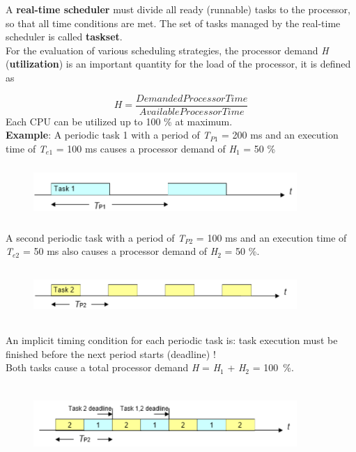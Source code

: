 A \textbf{real-time scheduler} must divide all ready (runnable) tasks to the processor, so that all time conditions are met. The set of tasks managed by the real-time scheduler is called \textbf{taskset}.\\

For the evaluation of various scheduling strategies, the processor demand \textit{H} (\textbf{utilization}) is an important quantity for the load of the processor, it is defined as

\begin{equation}
	H = \frac{Demanded Processor Time}{Available Processor Time}
\label{EQ 3}
\end{equation}
\newline
Each CPU can be utilized up to 100 \% at maximum.\\

\textbf{Example}: A periodic task 1 with a period of \textit{T}${}_{P1}$ = 200 ms and an execution time of \textit{T}${}_{e1}$ = 100 ms causes a processor demand of \textit{H}${}_{1}$ = 50 \%

	\begin{figure}[h]
    \centering
    \includegraphics[width=10cm, height=2cm]{Images/image83.png}
    \label{fig:Fig 29}
    \end{figure}
\nsl{\newpage}
A second periodic task with a period of \textit{T}${}_{P2}$ = 100 ms and an execution time of \textit{T}${}_{e2}$ = 50 ms also causes a processor demand of \textit{H}${}_{2}$ = 50 \%.

	\begin{figure}[h]
    \centering
    \includegraphics[width=10cm, height=2cm]{Images/image84.png}
    \label{fig:Fig 30}
    \end{figure} 

An implicit timing condition for each periodic task is: task execution must be finished before the next period starts (deadline) !\\

Both tasks cause a total processor demand \textit{H} = \textit{H}${}_{1}$ + \textit{H}${}_{2}$ = 100~\%.
\os{\newpage}
	\begin{figure}[h]
    \centering
    \includegraphics[width=10cm, height=3cm]{Images/image85.png}
    \label{fig:Fig 31}
    \end{figure} 
    
